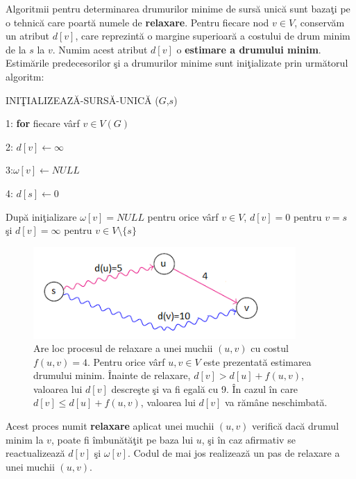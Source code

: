 \documentclass[11pt,a4paper]{report}
\begin{document}
  	Algoritmii pentru determinarea drumurilor minime de surs\u a unic\u a sunt baza\c ti pe o tehnic\u a care poart\u a numele de \textbf{relaxare}. Pentru fiecare nod $v\in V$, conserv\u am un atribut $d[v]$, care reprezint\u a o margine superioar\u a a costului de drum minim de la $s$ la $v$. Numim acest atribut $d[v]$ o \textbf{estimare a drumului minim}. Estim\u arile predecesorilor \c si a drumurilor minime sunt ini\c tializate prin urm\u atorul algoritm:
  	
  	\vspace{0.2cm}
  	INI\c TIALIZEAZ\u A-SURS\u A-UNIC\u A ($G$,$s$)
  	
  	\vspace{0.1cm}
  	1: \textbf{for} fiecare v\^ arf $v\in V(G)$ 
  	
  	2: \hspace{0.5cm}$d[v]\longleftarrow \infty$

    3:\hspace{0.6cm}$\omega[v]\longleftarrow NULL$
    
    4: $d[s]\longleftarrow 0$
    
    Dup\u a ini\c tializare $\omega [v]=NULL$ pentru orice v\^ arf $v\in V$, $d[v] = 0$ pentru $v=s$ \c si $d[v] = \infty $ pentru $v\in V\setminus \{s\}$
    \begin{figure}[!hbt]
    \centering
    	\includegraphics[width=10cm]{Relaxeaza.png}
    	\caption{Are loc procesul de relaxare a unei muchii $(u,v)$ cu costul $f(u,v)=4$. Pentru orice v\^ arf $u,v\in V$ este prezentat\u a estimarea drumului minim.  \^ Inainte de relaxare, $d[v] > d[u]+f(u,v)$, valoarea lui $d[v]$ descre\c ste \c si va fi egal\u a cu 9. \^ In cazul \^ in care $d[v]\leq d[u]+f(u,v)$, valoarea lui $d[v]$ va r\u am\^ ane neschimbat\u a.}
    \end{figure}

    Acest proces numit \textbf{relaxare} aplicat unei muchii $(u,v)$ verific\u a dac\u a drumul minim la $v$, poate fi \^ imbun\u at\u a\c tit pe baza lui $u$, \c si \^ in caz afirmativ se reactualizeaz\u a $d[v]$ \c si $\omega[v]$. Codul de mai jos realizeaz\u a un pas de relaxare a unei muchii $(u,v)$.
    
\end{document}
